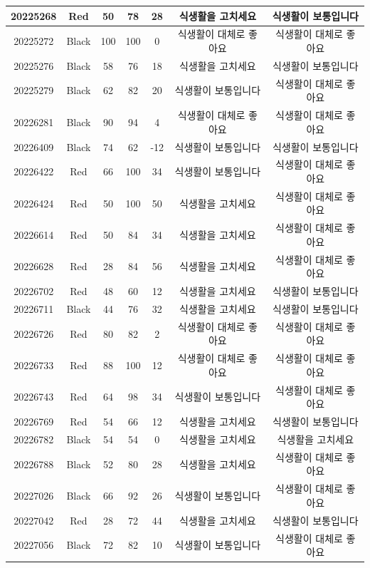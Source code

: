 \documentclass[
]{book}
\begin{document}
\begin{tabular}{c|c|c|c|c|c|c}
20225268 & Red & 50 & 78 & 28 & 식생활을 고치세요 & 식생활이 보통입니다\\
\hline
20225272 & Black & 100 & 100 & 0 & 식생활이 대체로 좋아요 & 식생활이 대체로 좋아요\\
\hline
20225276 & Black & 58 & 76 & 18 & 식생활을 고치세요 & 식생활이 보통입니다\\
\hline
20225279 & Black & 62 & 82 & 20 & 식생활이 보통입니다 & 식생활이 대체로 좋아요\\
\hline
20226281 & Black & 90 & 94 & 4 & 식생활이 대체로 좋아요 & 식생활이 대체로 좋아요\\
\hline
20226409 & Black & 74 & 62 & -12 & 식생활이 보통입니다 & 식생활이 보통입니다\\
\hline
20226422 & Red & 66 & 100 & 34 & 식생활이 보통입니다 & 식생활이 대체로 좋아요\\
\hline
20226424 & Red & 50 & 100 & 50 & 식생활을 고치세요 & 식생활이 대체로 좋아요\\
\hline
20226614 & Red & 50 & 84 & 34 & 식생활을 고치세요 & 식생활이 대체로 좋아요\\
\hline
20226628 & Red & 28 & 84 & 56 & 식생활을 고치세요 & 식생활이 대체로 좋아요\\
\hline
20226702 & Red & 48 & 60 & 12 & 식생활을 고치세요 & 식생활이 보통입니다\\
\hline
20226711 & Black & 44 & 76 & 32 & 식생활을 고치세요 & 식생활이 보통입니다\\
\hline
20226726 & Red & 80 & 82 & 2 & 식생활이 대체로 좋아요 & 식생활이 대체로 좋아요\\
\hline
20226733 & Red & 88 & 100 & 12 & 식생활이 대체로 좋아요 & 식생활이 대체로 좋아요\\
\hline
20226743 & Red & 64 & 98 & 34 & 식생활이 보통입니다 & 식생활이 대체로 좋아요\\
\hline
20226769 & Red & 54 & 66 & 12 & 식생활을 고치세요 & 식생활이 보통입니다\\
\hline
20226782 & Black & 54 & 54 & 0 & 식생활을 고치세요 & 식생활을 고치세요\\
\hline
20226788 & Black & 52 & 80 & 28 & 식생활을 고치세요 & 식생활이 대체로 좋아요\\
\hline
20227026 & Black & 66 & 92 & 26 & 식생활이 보통입니다 & 식생활이 대체로 좋아요\\
\hline
20227042 & Red & 28 & 72 & 44 & 식생활을 고치세요 & 식생활이 보통입니다\\
\hline
20227056 & Black & 72 & 82 & 10 & 식생활이 보통입니다 & 식생활이 대체로 좋아요\\

\end{tabular}
\end{document}
